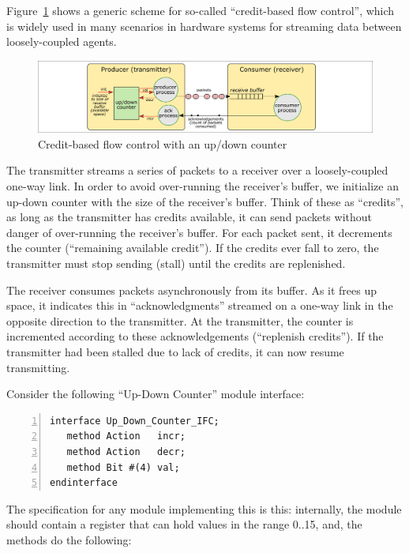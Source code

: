 Figure~\ref{Fig_Credit_Based_Flow_Control} shows a generic scheme for
 so-called ``credit-based flow control'', which is widely used in many
 scenarios in hardware systems for streaming data between
 loosely-coupled agents.
\begin{figure}[htbp]
  \centerline{\includegraphics[width=6in,angle=0]{Figures/Fig_Credit_Based_Flow_Control}}
  \caption{\label{Fig_Credit_Based_Flow_Control} Credit-based flow control with an up/down counter}
\end{figure}

The transmitter streams a series of packets to a receiver over a
loosely-coupled one-way link.  In order to avoid over-running the
receiver's buffer, we initialize an up-down counter with the size of
the receiver's buffer.  Think of these as ``credits'', {\ie} as long
as the transmitter has credits available, it can send packets without
danger of over-running the receiver's buffer.  For each packet sent,
it decrements the counter (``remaining available credit'').  If the
credits ever fall to zero, the transmitter must stop sending (stall)
until the credits are replenished.

The receiver consumes packets asynchronously from its buffer.  As it
frees up space, it indicates this in ``acknowledgments'' streamed on a
one-way link in the opposite direction to the transmitter.  At the
transmitter, the counter is incremented according to these
acknowledgements (``replenish credits'').  If the transmitter had been
stalled due to lack of credits, it can now resume transmitting.

Consider the following ``Up-Down Counter'' module interface:

{\footnotesize
\begin{Verbatim}[frame=single, numbers=left]
interface Up_Down_Counter_IFC;
   method Action   incr;
   method Action   decr;
   method Bit #(4) val;
endinterface
\end{Verbatim}
}

The specification for any module implementing this is this:
internally, the module should contain a register that can hold values
in the range 0..15, and, the methods do the following:

